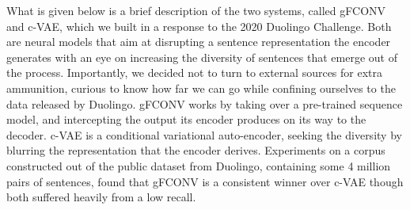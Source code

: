 What is given below is a brief description of the two systems, called gFCONV and c-VAE, which we built in a response to the 2020 Duolingo Challenge.  Both are neural models that aim at disrupting a sentence representation the encoder generates with an eye on increasing the diversity of sentences that emerge out of the process.  Importantly, we decided not to turn to external sources for extra ammunition, curious to know how far we can go while confining ourselves to the data released by Duolingo. gFCONV works by taking over a pre-trained sequence model, and intercepting the output its encoder produces on its way to the decoder. c-VAE is a conditional variational auto-encoder, seeking the diversity by blurring the representation that the encoder derives. Experiments on a corpus constructed out of the public dataset from Duolingo, containing some 4 million pairs of sentences,  found that gFCONV is a consistent winner over c-VAE though both suffered heavily from a low recall.

